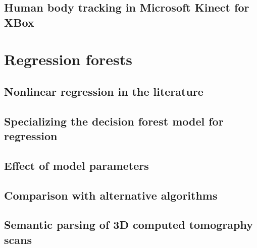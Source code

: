 \documentclass[11pt,aspectratio=1610,usenames,dvipsnames]{beamer} %
\begin{document}
\subsection{Human body tracking in Microsoft Kinect for XBox}%

\section{Regression forests}%
\subsection{Nonlinear regression in the literature}%
\subsection{Specializing the decision forest model for regression}%
\subsection{Effect of model parameters}%
\subsection{Comparison with alternative algorithms}%
\subsection{Semantic parsing of 3D computed tomography scans}%
\end{document}
